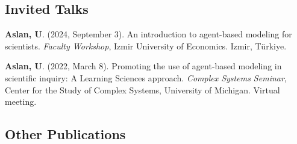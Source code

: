 \documentclass[11pt,letterpaper]{report} %
\begin{document}
    \subsection*{Invited Talks}

    \begin{tablist}

        \item[2024] \tab{}\textbf{Aslan, U}. (2024, September 3). An introduction to agent-based modeling for scientists. \textit{Faculty Workshop}, Izmir University of Economics. Izmir, Türkiye.

        \item[2022] \tab{}\textbf{Aslan, U}. (2022, March 8). Promoting the use of agent-based modeling in scientific inquiry: A Learning Sciences approach. \textit{Complex Systems Seminar}, Center for the Study of Complex Systems, University of Michigan. Virtual meeting.

    \end{tablist}



    \subsection*{Other Publications}
\end{document}
